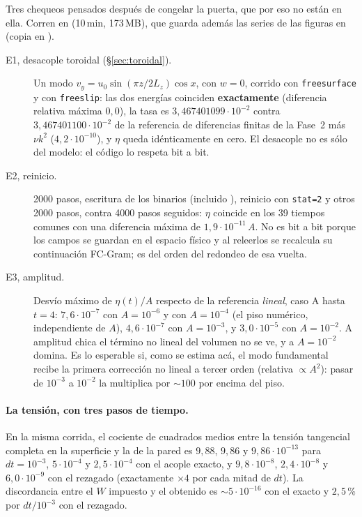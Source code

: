 Tres chequeos pensados después de congelar la puerta, que por eso no están en ella. Corren en
 (10\,min, 173\,MB), que guarda
además las series de las figuras en
 (copia en
).

\begin{description}
\item[E1, desacople toroidal (§\ref{sec:toroidal}).] Un modo
  $v_y=u_0\sin(\pi z/2L_z)\cos x$, con $w=0$, corrido con \texttt{freesurface} y con
  \texttt{freeslip}: las dos energías coinciden \textbf{exactamente} (diferencia relativa
  máxima $0{,}0$), la tasa es $3{,}467401099\cdot10^{-2}$ contra $3{,}467401100\cdot10^{-2}$ de
  la referencia de diferencias finitas de la Fase~2 más $\nu k^2$ ($4{,}2\cdot10^{-10}$), y
  $\eta$ queda idénticamente en cero. El desacople no es sólo del modelo: el código lo
  respeta bit a bit.
\item[E2, reinicio.] 2000 pasos, escritura de los binarios (incluido
  ), reinicio con \texttt{stat=2} y otros 2000 pasos, contra 4000
  pasos seguidos: $\eta$ coincide en los 39 tiempos comunes con una diferencia máxima de
  $1{,}9\cdot10^{-11}\,A$. No es bit a bit porque los campos se guardan en el espacio físico
  y al releerlos se recalcula su continuación FC-Gram; es del orden del redondeo de esa
  vuelta.
\item[E3, amplitud.] Desvío máximo de $\eta(t)/A$ respecto de la referencia \emph{lineal},
  caso A hasta $t=4$: $7{,}6\cdot10^{-7}$ con $A=10^{-6}$ y con $A=10^{-4}$ (el piso numérico,
  independiente de $A$), $4{,}6\cdot10^{-7}$ con $A=10^{-3}$, y $3{,}0\cdot10^{-5}$ con
  $A=10^{-2}$. A amplitud chica el término no lineal del volumen no se ve, y a
  $A=10^{-2}$ domina. Es lo esperable si, como se estima acá\propio, el modo fundamental
  recibe la primera corrección no lineal a tercer orden (relativa $\propto A^2$): pasar de
  $10^{-3}$ a $10^{-2}$ la multiplica por $\sim100$ por encima del piso.
\end{description}

\paragraph{La tensión, con tres pasos de tiempo.} En la misma corrida, el cociente de
cuadrados medios entre la tensión tangencial completa en la superficie y la de la pared es
$9{,}88$, $9{,}86$ y $9{,}86\cdot10^{-13}$ para $dt=10^{-3}$, $5\cdot10^{-4}$ y
$2{,}5\cdot10^{-4}$ con el acople exacto, y $9{,}8\cdot10^{-8}$, $2{,}4\cdot10^{-8}$ y
$6{,}0\cdot10^{-9}$ con el rezagado (exactamente $\times4$ por cada mitad de $dt$). La
discordancia entre el $W$ impuesto y el obtenido es $\sim5\cdot10^{-16}$ con el exacto y
$2{,}5$\,\% por $dt/10^{-3}$ con el rezagado.
